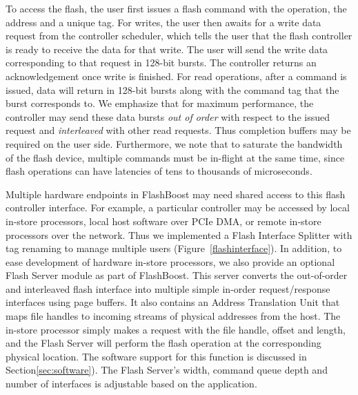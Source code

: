 To access the flash, the user first issues a flash command
with the operation, the address and a unique tag.
For writes, the user then awaits for a write data request from
the controller scheduler, which tells the user that the flash controller is
ready to receive the data for that write. The user will send the write data
corresponding to that request in 128-bit bursts. The controller returns an
acknowledgement once write is finished. 
For read operations, after a command is issued,
data will return in 128-bit bursts along with the command tag that the
burst corresponds to. We emphasize that for maximum performance, the
controller may send these data bursts \emph{out of order} with respect to
the issued request and \emph{interleaved} with other read requests.
Thus completion buffers may be required on the user side. Furthermore,
we note that to saturate the bandwidth of the flash device, multiple
commands must be in-flight at the same time, since flash operations
can have latencies of tens to thousands of microseconds. 


Multiple hardware endpoints in FlashBoost may need shared access to this
flash controller interface. For example, a particular controller may
be accessed by local in-store processors, local host software over PCIe
DMA, or remote in-store processors over the network. Thus we implemented a
Flash Interface Splitter with tag renaming to manage multiple users (Figure~\ref{flashinterface}). In addition, 
to ease development of hardware in-store processors,
we also provide an optional Flash Server module as part of FlashBoost. This server
converts the out-of-order and interleaved flash interface into
multiple simple in-order request/response interfaces
using page buffers. It also contains an Address Translation Unit that 
maps file handles to incoming streams of physical addresses from the host. The in-store processor
simply makes a request with the file handle, offset and length, and the Flash Server will perform
the flash operation at the corresponding physical location. The software
support for this function is discussed in Section\ref{sec:software}). The Flash
Server's width, command queue depth and number of interfaces is adjustable 
based on the application.

